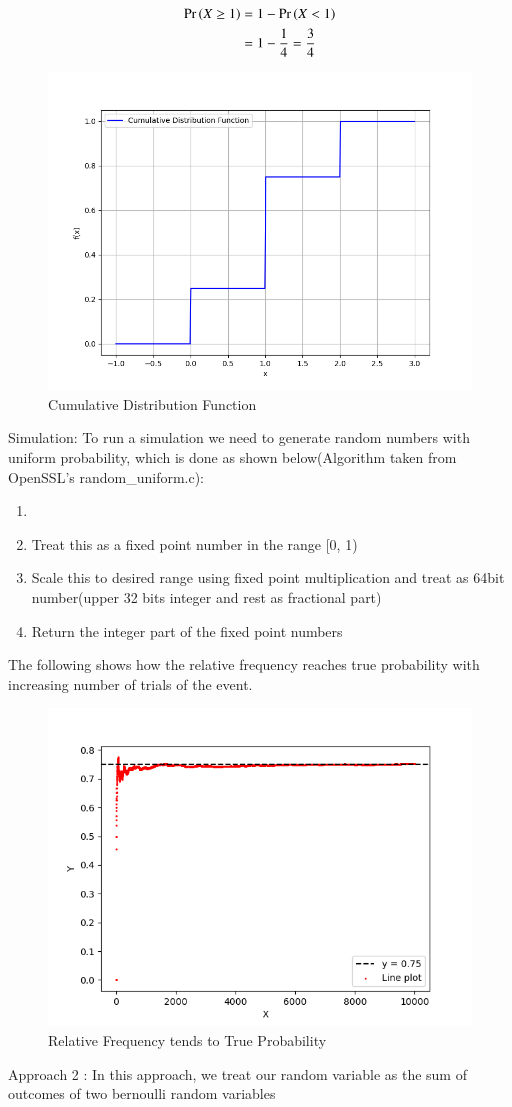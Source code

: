 \documentclass[journal]{IEEEtran}
\begin{document}
\begin{align}
  \Pr\left(X \ge 1\right) &= 1 - \Pr\left(X < 1\right)\\
  &= 1 - \frac{1}{4} = \frac{3}{4}
\end{align}
\begin{figure}[h!]
   \centering
   \includegraphics[width=0.7\columnwidth]{figs/fig2.png}
    \caption{Cumulative Distribution Function}
\end{figure}

Simulation:
\newline
To run a simulation we need to generate random numbers with uniform probability, which is done
as shown below(Algorithm taken from OpenSSL's random\_uniform.c):
\begin{enumerate}
  \item {}
  \item Treat this as a fixed point number in the range [0, 1)
  \item Scale this to desired range using fixed point multiplication and treat as 64bit number(upper 32 bits integer and rest as fractional part)
  \item Return the integer part of the fixed point numbers
\end{enumerate}
The following shows how the relative frequency reaches true probability with increasing number of trials of the event.
\begin{figure}[h!]
   \centering
   \includegraphics[width=0.7\columnwidth]{figs/fig.png}
    \caption{Relative Frequency tends to True Probability}
\end{figure}
\newline
Approach 2 :
\newline
In this approach, we treat our random variable as the sum of outcomes of two bernoulli random
variables
\end{document}
